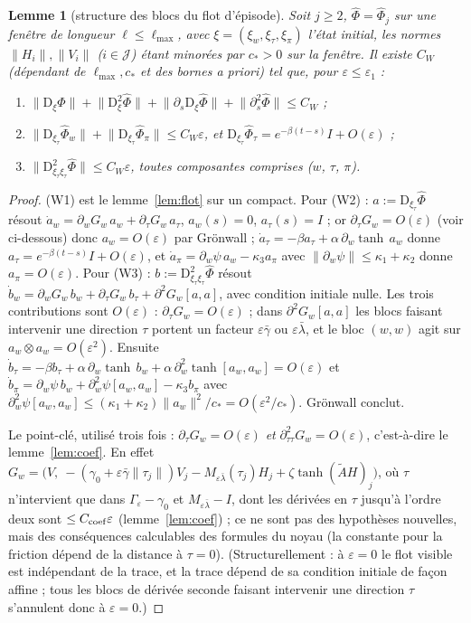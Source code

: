 \documentclass[11pt,a4paper]{article}
\newtheorem{lemme}[theoreme]{Lemme}
\theoremstyle{remark}
\theoremstyle{definition}
\newcommand{\norm}[1]{\lVert #1\rVert}
\newcommand{\eps}{\varepsilon}
\newcommand{\D}{\mathrm D}
\begin{document}
\begin{lemme}[structure des blocs du flot d'épisode]\label{lem:W}
Soit $j\ge2$, $\hat\Phi=\hat\Phi_j$ sur une fenêtre de longueur $\ell\le\ell_{\max}$, avec $\xi=(\xi_w,\xi_\tau,\xi_\pi)$ l'état initial, les normes $\norm{H_i},\norm{V_i}$ ($i\in\mathcal J$) étant minorées par $c_*>0$ sur la fenêtre. Il existe $C_W$ (dépendant de $\ell_{\max},c_*$ et des bornes a priori) tel que, pour $\eps\le\eps_1$ :
\begin{enumerate}[label=(W\arabic*)]
\item $\norm{\D_\xi\hat\Phi}+\norm{\D_\xi^2\hat\Phi}+\norm{\partial_s\D_\xi\hat\Phi}+\norm{\partial_s^2\hat\Phi}\le C_W$ ;
\item $\norm{\D_{\xi_\tau}\hat\Phi_w}+\norm{\D_{\xi_\tau}\hat\Phi_\pi}\le C_W\eps$, et $\D_{\xi_\tau}\hat\Phi_\tau=e^{-\beta(t-s)}I+O(\eps)$ ;
\item $\norm{\D^2_{\xi_\tau\xi_\tau}\hat\Phi}\le C_W\eps$, \emph{toutes composantes comprises ($w$, $\tau$, $\pi$)}.
\end{enumerate}
\end{lemme}
\begin{proof}
(W1) est le lemme~\ref{lem:flot} sur un compact. Pour (W2) : $a:=\D_{\xi_\tau}\hat\Phi$ résout $\dot a_w=\partial_wG_w\,a_w+\partial_\tau G_w\,a_\tau$, $a_w(s)=0$, $a_\tau(s)=I$ ; or $\partial_\tau G_w=O(\eps)$ (voir ci-dessous) donc $a_w=O(\eps)$ par Grönwall ; $\dot a_\tau=-\beta a_\tau+\alpha\,\partial_w\tanh\,a_w$ donne $a_\tau=e^{-\beta(t-s)}I+O(\eps)$, et $\dot a_\pi=\partial_w\psi\,a_w-\kappa_3a_\pi$ avec $\norm{\partial_w\psi}\le\kappa_1+\kappa_2$ donne $a_\pi=O(\eps)$. Pour (W3) : $b:=\D^2_{\xi_\tau\xi_\tau}\hat\Phi$ résout $\dot b_w=\partial_wG_w\,b_w+\partial_\tau G_w\,b_\tau+\partial^2G_w[a,a]$, avec condition initiale nulle. Les trois contributions sont $O(\eps)$ : $\partial_\tau G_w=O(\eps)$ ; dans $\partial^2G_w[a,a]$ les blocs faisant intervenir une direction $\tau$ portent un facteur $\eps\bar\gamma$ ou $\eps\bar\lambda$, et le bloc $(w,w)$ agit sur $a_w\otimes a_w=O(\eps^2)$. Ensuite $\dot b_\tau=-\beta b_\tau+\alpha\,\partial_w\tanh\,b_w+\alpha\,\partial_w^2\tanh[a_w,a_w]=O(\eps)$ et $\dot b_\pi=\partial_w\psi\,b_w+\partial_w^2\psi[a_w,a_w]-\kappa_3b_\pi$ avec $\partial_w^2\psi[a_w,a_w]\le(\kappa_1+\kappa_2)\norm{a_w}^2/c_*=O(\eps^2/c_*)$. Grönwall conclut.

Le point-clé, utilisé trois fois : $\partial_\tau G_w=O(\eps)$ \emph{et} $\partial^2_{\tau\tau}G_w=O(\eps)$, c'est-à-dire le lemme~\ref{lem:coef}. En effet $G_w=\bigl(V,\ -(\gamma_0+\eps\bar\gamma\norm{\tau_j})V_j-M_{\eps\bar\lambda}(\tau_j)H_j+\zeta\tanh(\tilde AH)_j\bigr)$, où $\tau$ n'intervient que dans $\Gamma_\eps-\gamma_0$ et $M_{\eps\bar\lambda}-I$, dont les dérivées en $\tau$ jusqu'à l'ordre deux sont $\le C_{\rm coef}\eps$ (lemme~\ref{lem:coef}) ; ce ne sont pas des hypothèses nouvelles, mais des conséquences calculables des formules du noyau (la constante pour la friction dépend de la distance à $\tau=0$). (Structurellement : à $\eps=0$ le flot visible est indépendant de la trace, et la trace dépend de sa condition initiale de façon affine ; tous les blocs de dérivée seconde faisant intervenir une direction $\tau$ s'annulent donc à $\eps=0$.)
\end{proof}
\end{document}
